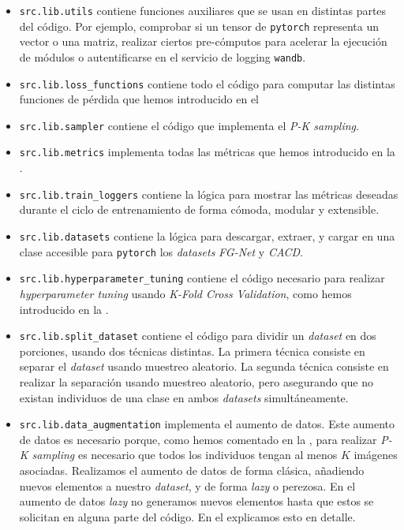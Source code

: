 \begin{itemize}
	\item \lstinline{src.lib.utils} contiene funciones auxiliares que se usan en distintas partes del código. Por ejemplo, comprobar si un tensor de \lstinline{pytorch} representa un vector o una matriz, realizar ciertos pre-cómputos para acelerar la ejecución de módulos o autentificarse en el servicio de logging \lstinline{wandb}.
	\item \lstinline{src.lib.loss_functions} contiene todo el código para computar las distintas funciones de pérdida que hemos introducido en el 
	\item \lstinline{src.lib.sampler} contiene el código que implementa el \textit{P-K sampling}.
	\item \lstinline{src.lib.metrics} implementa todas las métricas que hemos introducido en la .
	\item \lstinline{src.lib.train_loggers} contiene la lógica para mostrar las métricas deseadas durante el ciclo de entrenamiento de forma cómoda, modular y extensible.
	\item \lstinline{src.lib.datasets} contiene la lógica para descargar, extraer, y cargar en una clase accesible para \lstinline{pytorch} los \textit{datasets} \textit{FG-Net} y \textit{CACD}.
	\item \lstinline{src.lib.hyperparameter_tuning} contiene el código necesario para realizar \textit{hyperparameter tuning} usando \textit{K-Fold Cross Validation}, como hemos introducido en la .
	\item \lstinline{src.lib.split_dataset} contiene el código para dividir un \textit{dataset} en dos porciones, usando dos técnicas distintas. La primera técnica consiste en separar el \textit{dataset} usando muestreo aleatorio. La segunda técnica consiste en realizar la separación usando muestreo aleatorio, pero asegurando que no existan individuos de una clase en ambos \textit{datasets} simultáneamente.
	\item \lstinline{src.lib.data_augmentation} implementa el aumento de datos. Este aumento de datos es necesario porque, como hemos comentado en la , para realizar \textit{P-K sampling} es necesario que todos los individuos tengan al menos $K$ imágenes asociadas. Realizamos el aumento de datos de forma clásica, añadiendo nuevos elementos a nuestro \textit{dataset}, y de forma \textit{lazy} o perezosa. En el aumento de datos \textit{lazy} no generamos nuevos elementos hasta que estos se solicitan en alguna parte del código. En el  explicamos esto en detalle.
\end{itemize}

